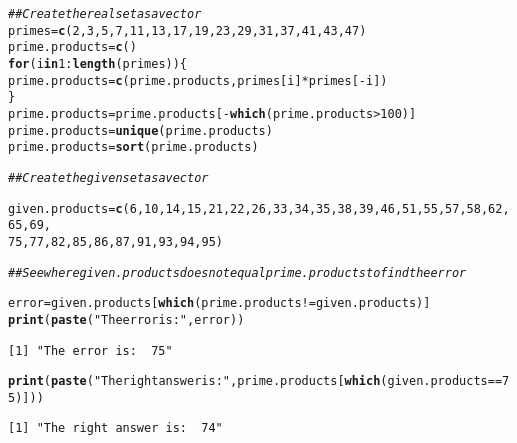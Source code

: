 \documentclass{article}\usepackage[]{graphicx}\usepackage[]{xcolor}
\makeatletter
\newcommand{\hlnum}[1]{\textcolor[rgb]{0.686,0.059,0.569}{#1}}%
\newcommand{\hlsng}[1]{\textcolor[rgb]{0.192,0.494,0.8}{#1}}%
\newcommand{\hlcom}[1]{\textcolor[rgb]{0.678,0.584,0.686}{\textit{#1}}}%
\newcommand{\hlopt}[1]{\textcolor[rgb]{0,0,0}{#1}}%
\newcommand{\hldef}[1]{\textcolor[rgb]{0.345,0.345,0.345}{#1}}%
\newcommand{\hlkwa}[1]{\textcolor[rgb]{0.161,0.373,0.58}{\textbf{#1}}}%
\newcommand{\hlkwb}[1]{\textcolor[rgb]{0.69,0.353,0.396}{#1}}%
\newcommand{\hlkwd}[1]{\textcolor[rgb]{0.737,0.353,0.396}{\textbf{#1}}}%
\newenvironment{kframe}{%
 \def\at@end@of@kframe{}%
 \ifinner\ifhmode%
  \def\at@end@of@kframe{\end{minipage}}%
  \begin{minipage}{\columnwidth}%
 \fi\fi%
 \def\FrameCommand##1{\hskip\@totalleftmargin \hskip-\fboxsep
 \colorbox{shadecolor}{##1}\hskip-\fboxsep
     \hskip-\linewidth \hskip-\@totalleftmargin \hskip\columnwidth}%
 \MakeFramed {\advance\hsize-\width
   \@totalleftmargin\z@ \linewidth\hsize
   \@setminipage}}%
 {\par\unskip\endMakeFramed%
 \at@end@of@kframe}
\newenvironment{knitrout}{}{} %
\makeatother
\begin{document}
\begin{enumerate}
\begin{knitrout}\scriptsize
{}\color{fgcolor}\begin{kframe}
\begin{alltt}
\hlcom{## Create the real set as a vector}
\hldef{primes} \hlkwb{=} \hlkwd{c}\hldef{(}\hlnum{2}\hldef{,} \hlnum{3}\hldef{,} \hlnum{5}\hldef{,} \hlnum{7}\hldef{,} \hlnum{11}\hldef{,} \hlnum{13}\hldef{,} \hlnum{17}\hldef{,} \hlnum{19}\hldef{,} \hlnum{23}\hldef{,} \hlnum{29}\hldef{,} \hlnum{31}\hldef{,} \hlnum{37}\hldef{,} \hlnum{41}\hldef{,} \hlnum{43}\hldef{,} \hlnum{47}\hldef{)}
\hldef{prime.products} \hlkwb{=} \hlkwd{c}\hldef{()}
\hlkwa{for}\hldef{(i} \hlkwa{in} \hlnum{1}\hlopt{:}\hlkwd{length}\hldef{(primes))\{}
  \hldef{prime.products} \hlkwb{=} \hlkwd{c}\hldef{(prime.products, primes[i]}\hlopt{*}\hldef{primes[}\hlopt{-}\hldef{i])}
\hldef{\}}
\hldef{prime.products} \hlkwb{=} \hldef{prime.products[}\hlopt{-}\hlkwd{which}\hldef{(prime.products}\hlopt{>}\hlnum{100}\hldef{)]}
\hldef{prime.products} \hlkwb{=} \hlkwd{unique}\hldef{(prime.products)}
\hldef{prime.products} \hlkwb{=} \hlkwd{sort}\hldef{(prime.products)}

\hlcom{## Create the given set as a vector}

\hldef{given.products} \hlkwb{=} \hlkwd{c}\hldef{(}\hlnum{6}\hldef{,} \hlnum{10}\hldef{,} \hlnum{14}\hldef{,} \hlnum{15}\hldef{,} \hlnum{21}\hldef{,} \hlnum{22}\hldef{,} \hlnum{26}\hldef{,} \hlnum{33}\hldef{,} \hlnum{34}\hldef{,} \hlnum{35}\hldef{,} \hlnum{38}\hldef{,} \hlnum{39}\hldef{,} \hlnum{46}\hldef{,} \hlnum{51}\hldef{,} \hlnum{55}\hldef{,} \hlnum{57}\hldef{,} \hlnum{58}\hldef{,} \hlnum{62}\hldef{,} \hlnum{65}\hldef{,} \hlnum{69}\hldef{,}
                   \hlnum{75}\hldef{,} \hlnum{77}\hldef{,} \hlnum{82}\hldef{,} \hlnum{85}\hldef{,} \hlnum{86}\hldef{,} \hlnum{87}\hldef{,} \hlnum{91}\hldef{,} \hlnum{93}\hldef{,} \hlnum{94}\hldef{,} \hlnum{95}\hldef{)}

\hlcom{## See where given.products does not equal prime.products to find the error}

\hldef{error} \hlkwb{=} \hldef{given.products[}\hlkwd{which}\hldef{(prime.products}\hlopt{!=}\hldef{given.products)]}
\hlkwd{print}\hldef{(}\hlkwd{paste}\hldef{(}\hlsng{"The error is: "}\hldef{, error))}
\end{alltt}
\begin{verbatim}
[1] "The error is:  75"
\end{verbatim}
\begin{alltt}
\hlkwd{print}\hldef{(}\hlkwd{paste}\hldef{(}\hlsng{"The right answer is: "}\hldef{, prime.products[}\hlkwd{which}\hldef{(given.products}\hlopt{==}\hlnum{75}\hldef{)]))}
\end{alltt}
\begin{verbatim}
[1] "The right answer is:  74"
\end{verbatim}
\end{kframe}
\end{knitrout}
\end{enumerate}


\end{document}
